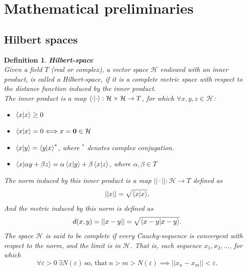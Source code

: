 \documentclass[12pt, a4paper,  nobibnotes]{article}
\newcommand{\bb}[1]{\mathbf{#1}}
\newtheorem{definition}{Definition}
\begin{document}

%
%


\appendix
\section{Mathematical preliminaries}

\subsection{Hilbert spaces}
\begin{definition}
    \textbf{Hilbert-space}\\
    Given a field $T$ (real or complex), a vector space $\mathcal H$ endowed with an inner product, is called a Hilbert-space, if
    it is a complete metric space with respect to the distance function induced by the inner product.
    \\
    The inner product is a map $\braket{\cdot|\cdot}:\mathcal{H}\times\mathcal{H} \rightarrow T$, 
    for which $\forall x,y,z \in \mathcal H$:
    \begin{itemize}
        \item $\braket{x|x} \geq 0$
        \item $\braket{x|x} = 0 \Longleftrightarrow x = \bb 0 \in \mathcal H$
        \item $\braket{x|y} = \braket{y|x}^*$, where $^*$ denotes complex conjugation.
        \item $\braket{x|\alpha y + \beta z} = \alpha\braket{x|y} + \beta\braket{x|z}$, where $\alpha, \beta \in T$
    \end{itemize}
    The norm induced by this inner product is a map $||\cdot||:\mathcal H \rightarrow T$ defined as
    \begin{equation*}
        ||x||=\sqrt{\braket{x|x}},
    \end{equation*}
    And the metric induced by this norm is defined as
    \begin{equation*}
        d(x,y) = ||x - y|| = \sqrt{\braket{x - y|x - y}}.
    \end{equation*}
    The space $\mathcal H$ is said to be complete if every Cauchy-sequence is convergent with respect to the norm, and
    the limit is in $\mathcal H$. That is, each sequence ${x_1, x_2, ... }$, for which 
    \begin{equation*}
        \forall \varepsilon > 0 ~ \exists N(\varepsilon) ~\textrm{so, that}~ n>m>N(\varepsilon) \implies ||x_n - x_m||<\varepsilon.
    \end{equation*}
\end{definition} 
\end{document}
